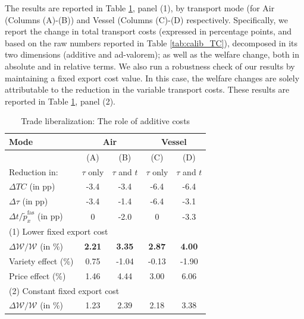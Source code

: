 \documentclass[a4paper,11pt]{article}
\begin{document}
The results are reported in Table \ref{tab:resultats_modele}, panel (1), by transport mode (for Air (Columns (A)-(B)) and Vessel (Columns (C)-(D) respectively. Specifically, we report the change in total transport costs (expressed in percentage points, and based on the raw numbers reported in Table \ref{tab:calib_TC}), decomposed in its two dimensions (additive and ad-valorem); as well as the welfare change, both in absolute and in relative terms. We also run a robustness check of our results by maintaining a fixed export cost value. In this case, the welfare changes are solely attributable to the reduction in the variable transport costs. These results are reported in Table \ref{tab:resultats_modele}, panel (2).


\begin{table}[htbp]
  \centering
  \caption{Trade liberalization: The role of additive costs} \label{tab:resultats_modele}
\begin{center}
\begin{tabular}{l||c|c||c|c}
\hline
Mode & \multicolumn{2}{|c||}{Air} & \multicolumn{2}{c}{Vessel} \\ \hline
& (A) & (B) & (C) & (D)  \\
Reduction in: & $\tau$ only & $\tau$ and $t$ &$\tau$ only & $\tau$ and $t$\\  \hline
$\Delta TC$ (in pp) &-3.4 &-3.4 &-6.4 &-6.4   \\
$\Delta \tau$ (in pp) & -3.4	&-1.4&-6.4&	-3.1	 \\
$\Delta t/\widetilde{p}_x^{\text{fas}}$ (in pp) & 0&	-2.0&	0&	-3.3 \\ \hline \hline
\multicolumn{4}{l}{(1) Lower fixed export cost} \\ \hline
$\Delta \mathcal{W}/\mathcal{W}$ (in \%) & 	\textbf{2.21}	&\textbf{3.35}	&	\textbf{2.87}&	\textbf{4.00 }  \\\hline
Variety effect (\%)&0.75 &-1.04	&-0.13	&-1.90 \\
Price effect (\%)&	1.46 &	4.44&		 3.00&	6.06 \\ \hline \hline
\multicolumn{4}{l}{(2) Constant fixed export cost} \\ \hline
$\Delta \mathcal{W}/\mathcal{W}$ (in \%) & 1.23&	2.39 & 2.18	&3.38 	 \\ \hline

\end{tabular}
\end{center}
\end{table}
\end{document}
